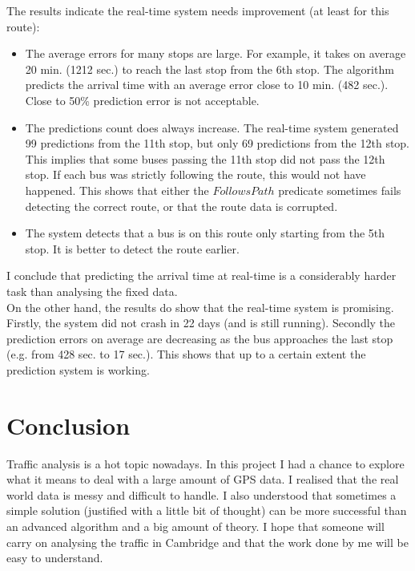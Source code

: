 \documentclass[12pt,a4paper,oneside,openright]{report}
\begin{document}
The results indicate the real-time system needs improvement (at least for this route):

\begin{itemize}
    \item The average errors for many stops are large. For example, it takes on average
    20 min. (1212 sec.) to reach the last stop from the 6th stop. The algorithm predicts the arrival
    time with an average error close to 10 min. (482 sec.).
    Close to 50\% prediction error is not acceptable.

    \item The predictions count does always increase. The real-time system generated
    99 predictions from the 11th stop, but only 69 predictions from the 12th stop. This implies
    that some buses passing the 11th stop did not pass the 12th stop. If each bus was
    strictly following the route, this would not have happened. This shows that either the
    $FollowsPath$ predicate sometimes fails detecting the correct route, or that the route data
    is corrupted.

    \item The system detects that a bus is on this route only starting from the 5th stop. It is
    better to detect the route earlier.

\end{itemize}

I conclude that predicting the arrival time at real-time is a considerably harder task than analysing
the fixed data. \\

On the other hand, the results do show that the real-time system is promising. Firstly, the system
did not crash in 22 days (and is still running). Secondly the prediction errors on average are
decreasing as the bus approaches the last stop (e.g. from 428 sec. to 17 sec.). This shows that
up to a certain extent the prediction system is working.

\chapter{Conclusion}

Traffic analysis is a hot topic nowadays. In this project I had a chance to explore what it
means to deal with a large amount of GPS data. I realised that the real world data is messy and
difficult to handle. I also understood that sometimes a simple solution (justified with a little bit
of thought) can be more successful than an advanced algorithm and a big amount of theory.
I hope that someone will carry on analysing the traffic in Cambridge and that the work done by me
will be easy to understand. \\
\end{document}
